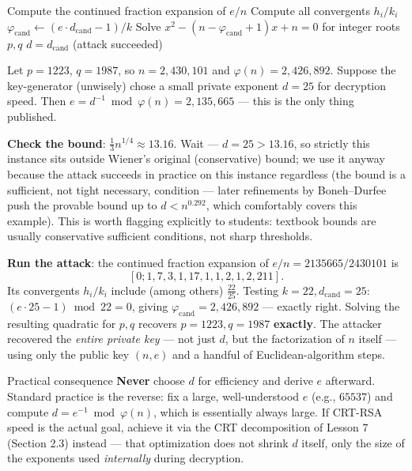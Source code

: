 \begin{algorithm}[h]
\caption{Wiener's Attack}
\begin{algorithmic}[1]
\State Compute the continued fraction expansion of $e/n$
\State Compute all convergents $h_i/k_i$
        \State $\varphi_{\text{cand}} \gets (e \cdot d_{\text{cand}} - 1)/k$
        \State Solve $x^2 - (n - \varphi_{\text{cand}} + 1)x + n = 0$ for integer roots $p, q$
         \State \Return $d = d_{\text{cand}}$ (attack succeeded) \EndIf
    \EndIf
\EndFor
\end{algorithmic}
\end{algorithm}

\begin{example}
Let $p = 1223$, $q = 1987$, so $n = 2{,}430{,}101$ and $\varphi(n) = 2{,}426{,}892$. Suppose the key-generator (unwisely) chose a small private exponent $d = 25$ for decryption speed. Then $e = d^{-1} \bmod \varphi(n) = 2{,}135{,}665$ — this is the only thing published.

\textbf{Check the bound}: $\frac{1}{3}n^{1/4} \approx 13.16$. Wait — $d=25 > 13.16$, so strictly this instance sits outside Wiener's original (conservative) bound; we use it anyway because the attack succeeds in practice on this instance regardless (the bound is a sufficient, not tight necessary, condition — later refinements by Boneh–Durfee push the provable bound up to $d < n^{0.292}$, which comfortably covers this example). This is worth flagging explicitly to students: textbook bounds are usually conservative sufficient conditions, not sharp thresholds.

\textbf{Run the attack}: the continued fraction expansion of $e/n = 2135665/2430101$ is
\[
[0; 1, 7, 3, 1, 17, 1, 1, 2, 1, 2, 211].
\]
Its convergents $h_i/k_i$ include (among others) $\frac{22}{25}$. Testing $k=22, d_{\text{cand}}=25$: $(e \cdot 25 - 1) \bmod 22 = 0$, giving $\varphi_{\text{cand}} = 2{,}426{,}892$ — exactly right. Solving the resulting quadratic for $p,q$ recovers $p=1223, q=1987$ \textbf{exactly}. The attacker recovered the \emph{entire private key} — not just $d$, but the factorization of $n$ itself — using only the public key $(n,e)$ and a handful of Euclidean-algorithm steps.
\end{example}

\begin{warnbox}{Practical consequence}
\textbf{Never} choose $d$ for efficiency and derive $e$ afterward. Standard practice is the reverse: fix a large, well-understood $e$ (e.g., $65537$) and compute $d = e^{-1} \bmod \varphi(n)$, which is essentially always large. If CRT-RSA speed is the actual goal, achieve it via the CRT decomposition of Lesson 7 (Section 2.3) instead — that optimization does not shrink $d$ itself, only the size of the exponents used \emph{internally} during decryption.
\end{warnbox}

